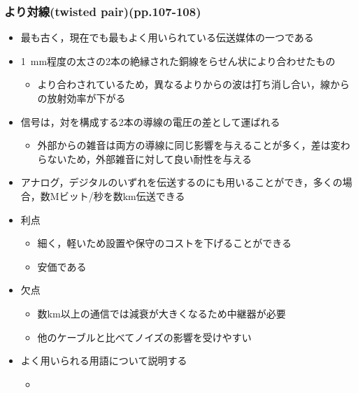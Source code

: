 \documentclass[a4paper]{ltjsarticle}
\begin{document}
		\subsubsection{より対線(twisted pair)(pp.107-108)}
			\begin{itemize}
				\item 最も古く，現在でも最もよく用いられている伝送媒体の一つである
				\item \SI{1}{mm}程度の太さの2本の絶縁された銅線をらせん状により合わせたもの
				\begin{itemize}
					\item より合わされているため，異なるよりからの波は打ち消し合い，線からの放射効率が下がる
				\end{itemize}
				\item 信号は，対を構成する2本の導線の電圧の差として運ばれる
				\begin{itemize}
					\item 外部からの雑音は両方の導線に同じ影響を与えることが多く，差は変わらないため，外部雑音に対して良い耐性を与える
				\end{itemize}
				\item アナログ，デジタルのいずれを伝送するのにも用いることができ，多くの場合，数Mビット/秒を数km伝送できる
				\item 利点
				\begin{itemize}
					\item 細く，軽いため設置や保守のコストを下げることができる
					\item 安価である
				\end{itemize}
				\item 欠点
				\begin{itemize}
					\item 数km以上の通信では減衰が大きくなるため中継器が必要
					\item 他のケーブルと比べてノイズの影響を受けやすい
				\end{itemize}
				\item よく用いられる用語について説明する
				\begin{itemize}
					\item {}
\end{itemize}
\end{itemize}
\end{document}
